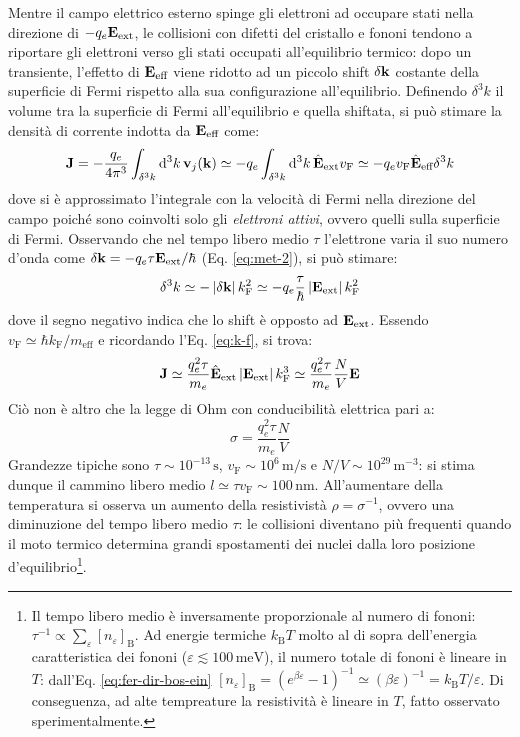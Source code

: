 Mentre il campo elettrico esterno spinge gli elettroni ad occupare stati nella direzione di $ -q_e \mathbf{E}_\text{ext} $, le collisioni con difetti del cristallo e fononi tendono a riportare gli elettroni verso gli stati occupati all'equilibrio termico: dopo un transiente, l'effetto di $ \mathbf{E}_\text{eff} $ viene ridotto ad un piccolo shift $ \delta \mathbf{k} $ costante della superficie di Fermi rispetto alla sua configurazione all'equilibrio. Definendo $ \delta^3k $ il volume tra la superficie di Fermi all'equilibrio e quella shiftata, si può stimare la densità di corrente indotta da $ \mathbf{E}_\text{eff} $ come:
\begin{equation*}
	\mathbf{J} = - \frac{q_e}{4\pi^3} \int_{\delta^3k} \mathrm{d}^3k\, \mathbf{v}_j(\mathbf{k}) \simeq - q_e \int_{\delta^3k} \mathrm{d}^3k\, \hat{\mathbf{E}}_\text{ext} v_\text{F} \simeq -q_e v_\text{F} \hat{\mathbf{E}}_\text{eff} \delta^3k
\end{equation*}
dove si è approssimato l'integrale con la velocità di Fermi nella direzione del campo poiché sono coinvolti solo gli \textit{elettroni attivi}, ovvero quelli sulla superficie di Fermi. Osservando che nel tempo libero medio $ \tau $ l'elettrone varia il suo numero d'onda come $ \delta\mathbf{k} = -q_e \tau \mathbf{E}_\text{ext} / \hbar $ (Eq. \ref{eq:met-2}), si può stimare:
\begin{equation*}
	\delta^3k \simeq - \left\lvert\delta\mathbf{k}\right\rvert k_\text{F}^2 \simeq - q_e \frac{\tau}{\hbar} \left\lvert\mathbf{E}_\text{ext}\right\rvert k_\text{F}^2
\end{equation*}
dove il segno negativo indica che lo shift è opposto ad $ \mathbf{E}_\text{ext} $. Essendo $ v_\text{F} \simeq \hbar k_\text{F} / m_\text{eff} $ e ricordando l'Eq. \ref{eq:k-f}, si trova:
\begin{equation*}
	\mathbf{J} \simeq \frac{q_e^2 \tau}{m_e} \hat{\mathbf{E}}_\text{ext} \left\lvert\mathbf{E}_\text{ext}\right\rvert k_\text{F}^3 \simeq \frac{q_e^2 \tau}{m_e} \frac{N}{V} \mathbf{E}
\end{equation*}
Ciò non è altro che la legge di Ohm con conducibilità elettrica pari a:
\begin{equation}
	\sigma = \frac{q_e^2 \tau}{m_e} \frac{N}{V}
\end{equation}
Grandezze tipiche sono $ \tau \sim 10^{-13} \,\text{s} $, $ v_\text{F} \sim 10^6 \,\text{m}/\text{s} $ e $ N/V \sim 10^{29} \,\text{m}^{-3} $: si stima dunque il cammino libero medio $ l \simeq \tau v_\text{F} \sim 100 \,\text{nm} $. All'aumentare della temperatura si osserva un aumento della resistivistà $ \rho = \sigma^{-1} $, ovvero una diminuzione del tempo libero medio $ \tau $: le collisioni diventano più frequenti quando il moto termico determina grandi spostamenti dei nuclei dalla loro posizione d'equilibrio\footnote{Il tempo libero medio è inversamente proporzionale al numero di fononi: $ \tau^{-1} \propto \sum_\varepsilon [n_\varepsilon]_\text{B} $. Ad energie termiche $ k_\text{B} T $ molto al di sopra dell'energia caratteristica dei fononi ($ \varepsilon \lesssim 100 \,\text{meV} $), il numero totale di fononi è lineare in $ T $: dall'Eq. \ref{eq:fer-dir-bos-ein} $ [n_\varepsilon]_\text{B} = (e^{\beta \varepsilon} - 1)^{-1} \simeq (\beta \varepsilon)^{-1} = k_\text{B} T / \varepsilon $. Di conseguenza, ad alte tempreature la resistività è lineare in $ T $, fatto osservato sperimentalmente.}.

